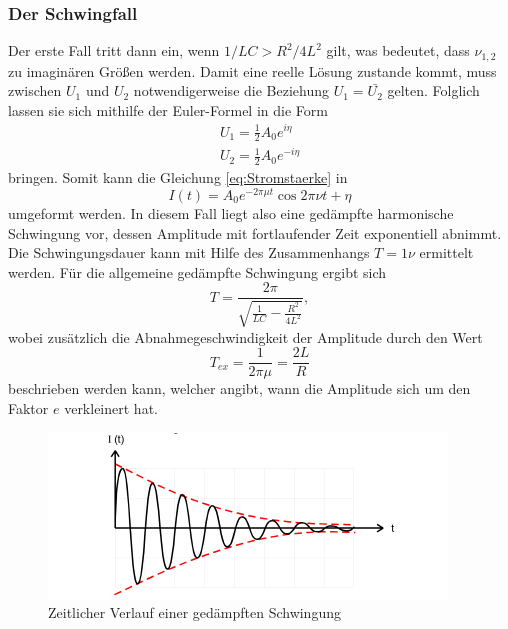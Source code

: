 \subsubsection{Der Schwingfall}
Der erste Fall tritt dann ein, wenn $1/LC > R^{2}/4L^{2}$ gilt, was bedeutet,
dass $\nu_{1,2}$ zu imaginären Größen werden. Damit eine reelle Lösung zustande kommt, muss
zwischen $U_1$ und $U_2$ notwendigerweise die Beziehung $U_1 = \bar{U_2}$ gelten. Folglich lassen 
sie sich mithilfe der Euler-Formel in die Form
\begin{align*}
    U_1 = \frac{1}{2} A_0 e^{i \eta} \\
    U_2 = \frac{1}{2} A_0 e^{-i \eta}
\end{align*}
\noindent bringen. Somit kann die Gleichung \ref{eq:Stromstaerke} in
\begin{equation}
    I(t) = A_0 e^{-2\pi \mu t} \cos{2\pi \nu t + \eta}
    \label{eq:a1}
\end{equation}
\noindent umgeformt werden. In diesem Fall liegt also eine gedämpfte harmonische Schwingung vor, 
dessen Amplitude mit fortlaufender Zeit exponentiell abnimmt. Die Schwingungsdauer kann
mit Hilfe des Zusammenhangs $T = 1\nu$ ermittelt werden. Für die allgemeine 
gedämpfte Schwingung ergibt sich 
\begin{equation}
    T = \frac{2\pi}{\sqrt{\frac{1}{LC}-\frac{R^{2}}{4L^{2}}}}, 
\end{equation}
\noindent wobei zusätzlich die Abnahmegeschwindigkeit der Amplitude durch den Wert 
\begin{equation}
    T_{ex} = \frac{1}{2\pi\mu} = \frac{2L}{R}
    \label{eq:a2}
\end{equation}
\noindent beschrieben werden kann, welcher angibt, wann die Amplitude sich um den Faktor $e$
verkleinert hat.

\begin{figure}[H]
  \centering
  \includegraphics{content/VerlaufGedaempfteSchwingung.png}
  \caption{Zeitlicher Verlauf einer gedämpften Schwingung \cite{sample354}}
  \label{fig:gsk}
\end{figure}


